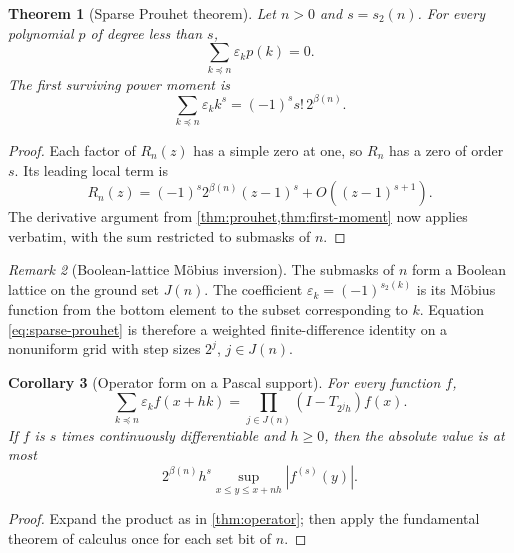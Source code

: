 \documentclass[11pt,oneside]{article}
\newtheorem{theorem}{Theorem}[section]
\newtheorem{corollary}[theorem]{Corollary}
\theoremstyle{definition}
\theoremstyle{remark}
\newtheorem{remark}[theorem]{Remark}
\newcommand{\swt}{s_2}
\newcommand{\eps}{\varepsilon}
\newcommand{\submask}{\preccurlyeq}
\newcommand{\1}{\mathbf 1}
\begin{document}
\begin{theorem}[Sparse Prouhet theorem]
\label{thm:sparse-prouhet}
Let \(n>0\) and \(s=\swt(n)\).  For every polynomial \(p\) of degree less than \(s\),
\begin{equation}
 \boxed{
 \sum_{k\submask n}\eps_kp(k)=0.}
 \label{eq:sparse-prouhet}
\end{equation}
The first surviving power moment is
\begin{equation}
 \boxed{
 \sum_{k\submask n}\eps_kk^s=(-1)^s s!\,2^{\beta(n)}.}
 \label{eq:sparse-first-moment}
\end{equation}
\end{theorem}

\begin{proof}
Each factor of \(R_n(z)\) has a simple zero at one, so \(R_n\) has a zero of order
\(s\).  Its leading local term is
\[
 R_n(z)=(-1)^s2^{\beta(n)}(z-1)^s+O((z-1)^{s+1}).
\]
The derivative argument from \cref{thm:prouhet,thm:first-moment} now applies verbatim, with
the sum restricted to submasks of \(n\).
\end{proof}

\begin{remark}[Boolean-lattice Möbius inversion]
The submasks of \(n\) form a Boolean lattice on the ground set \(J(n)\).  The coefficient
\(\eps_k=(-1)^{\swt(k)}\) is its Möbius function from the bottom element to the subset
corresponding to \(k\).  Equation \eqref{eq:sparse-prouhet} is therefore a weighted
finite-difference identity on a nonuniform grid with step sizes \(2^j\), \(j\in J(n)\).
\end{remark}

\begin{corollary}[Operator form on a Pascal support]
\label{cor:sparse-operator}
For every function \(f\),
\begin{equation}
 \sum_{k\submask n}\eps_k f(x+hk)
 =\prod_{j\in J(n)}(I-T_{2^jh})f(x).
 \label{eq:sparse-operator}
\end{equation}
If \(f\) is \(s\) times continuously differentiable and \(h\ge0\), then the absolute value is
at most
\begin{equation}
 2^{\beta(n)}h^s
 \sup_{x\le y\le x+nh}|f^{(s)}(y)|.
 \label{eq:sparse-bound}
\end{equation}
\end{corollary}

\begin{proof}
Expand the product as in \cref{thm:operator}; then apply the fundamental theorem of calculus
once for each set bit of \(n\).
\end{proof}
\end{document}
